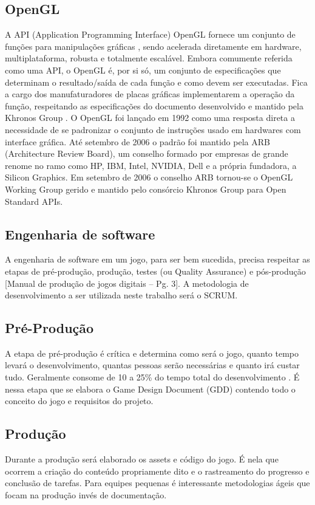 \documentclass[12pt, 
openright, 
oneside, 
a4paper,    
brazil]{facom-ufu-abntex2}
\begin{document}
\subsection{OpenGL}
A API (Application Programming Interface) OpenGL fornece um conjunto de funções para manipulações gráficas \cite{LearnOpenGL}, sendo acelerada diretamente em hardware, multiplataforma, robusta e totalmente escalável. Embora comumente referida como uma API, o OpenGL é, por si só, um conjunto de especificações que determinam o resultado/saída de cada função e como devem ser executadas. Fica a cargo dos manufaturadores de placas gráficas implementarem a operação da função, respeitando as especificações do documento desenvolvido e mantido pela Khronos Group \cite{KhronosOpenGLSpecification}.
 O OpenGL foi lançado em 1992 como uma resposta direta a necessidade de se padronizar o conjunto de instruções usado em hardwares com interface gráfica. Até setembro de 2006 o padrão foi mantido pela ARB (Architecture Review Board), um conselho formado por empresas de grande renome no ramo como HP, IBM, Intel, NVIDIA, Dell e a própria fundadora, a Silicon Graphics. Em setembro de 2006 o conselho ARB tornou-se o OpenGL Working Group gerido e mantido pelo consórcio Khronos Group para Open Standard APIs\cite{OpenGLAbout}.
 
\subsection{Engenharia de software}
A engenharia de software em um jogo, para ser bem sucedida, precisa respeitar as etapas de pré-produção, produção, testes (ou Quality Assurance) e pós-produção [Manual de produção de jogos digitais – Pg. 3]. A metodologia de desenvolvimento a ser utilizada neste trabalho será o SCRUM.

\subsection{Pré-Produção}
A etapa de pré-produção é crítica e determina como será o jogo, quanto tempo levará o desenvolvimento, quantas pessoas serão necessárias e quanto irá custar tudo. Geralmente consome de 10 a 25\% do tempo total do desenvolvimento \cite{Manualdejogosdigitais}. É nessa etapa que se elabora o Game Design Document (GDD) contendo todo o conceito do jogo e requisitos do projeto.

\subsection{Produção}
Durante a produção será elaborado os assets e código do jogo. É nela que ocorrem a criação do conteúdo propriamente dito e o rastreamento do progresso e conclusão de tarefas\cite{Manualdejogosdigitais}. Para equipes pequenas é interessante metodologias ágeis que focam na produção invés de documentação.
\end{document}
